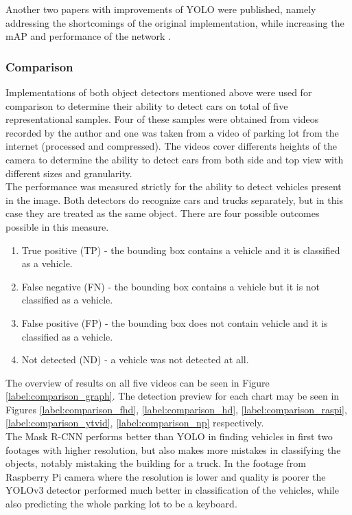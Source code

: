\documentclass[thesis=M,english]{FITthesis}[2019/03/06]
\begin{document}
Another two papers with improvements of YOLO were published, namely addressing the shortcomings of the original implementation, while increasing the mAP and performance of the network \cite{yolov2} \cite{redmon2018yolov3}.

\subsubsection{Comparison}
Implementations of both object detectors mentioned above were used for comparison to determine their ability to detect cars on total of five representational samples. Four of these samples were obtained from videos recorded by the author and one was taken from a video of parking lot from the internet (processed and compressed). The videos cover differents heights of the camera to determine the ability to detect cars from both side and top view with different sizes and granularity. \\

The performance was measured strictly for the ability to detect vehicles present in the image. Both detectors do recognize cars and trucks separately, but in this case they are treated as the same object. There are four possible outcomes possible in this measure.

\begin{enumerate}
    \item True positive (TP) - the bounding box contains a vehicle and it is classified as a vehicle.
    \item False negative (FN) - the bounding box contains a vehicle but it is not classified as a vehicle.
    \item False positive (FP) - the bounding box does not contain vehicle and it is classified as a vehicle.
    \item Not detected (ND) - a vehicle was not detected at all.
\end{enumerate}

The overview of results on all five videos can be seen in Figure \ref{label:comparison_graph}. The detection preview for each chart may be seen in Figures \ref{label:comparison_fhd}, \ref{label:comparison_hd}, \ref{label:comparison_raspi},  \ref{label:comparison_ytvid}, \ref{label:comparison_np} respectively.\\

The Mask R-CNN performs better than YOLO in finding vehicles in first two footages with higher resolution, but also makes more mistakes in classifying the objects, notably mistaking the building for a truck. In the footage from Raspberry Pi camera where the resolution is lower and quality is poorer the YOLOv3 detector performed much better in classification of the vehicles, while also predicting the whole parking lot to be a keyboard.\\
\end{document}
